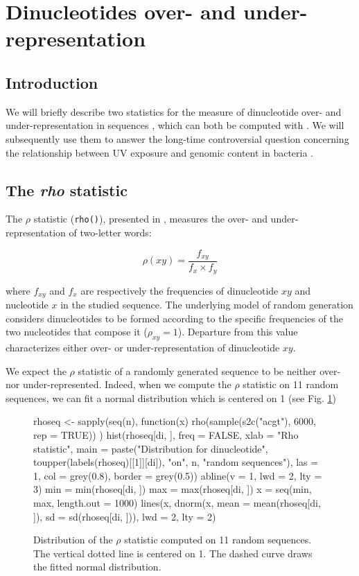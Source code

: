 \documentclass{article}
\begin{document}
\section{Dinucleotides over- and under-representation}
\label{dinu}

\subsection{Introduction}

We will briefly describe two statistics for the measure of
dinucleotide over- and under-representation in sequences
\cite{Karlin,UV}, which can both be computed with \seqinr{}. We will
subsequently use them to answer the long-time controversial question
concerning the relationship between UV exposure and genomic content in
bacteria \cite{Singer,Bak}.

\subsection{The \textit{rho} statistic}

The $\rho$ statistic (\texttt{rho()}), presented in \cite{Karlin},
measures the over- and under-representation of two-letter words:

$$\rho(xy) = \frac{f_{xy}}{f_{x}\times f_{y}}$$

where $f_{xy}$ and $f_{x}$ are respectively the frequencies of
dinucleotide $xy$ and nucleotide $x$ in the studied sequence. The
underlying model of random generation considers dinucleotides to be
formed according to the specific frequencies of the two nucleotides
that compose it ($\rho_{xy} = 1$). Departure from this value
characterizes either over- or under-representation of dinucleotide
$xy$.


We expect the $\rho$ statistic of a randomly generated sequence to be
neither over- nor under-represented. Indeed, when we compute the
$\rho$ statistic on 11 random
sequences, we can fit a normal distribution which is centered on 1
(see Fig. \ref{rho})

\begin{figure}[H]
  \begin{center}
\begin{Schunk}
\begin{Sinput}
 rhoseq <- sapply(seq(n), function(x) {
     rho(sample(s2c("acgt"), 6000, rep = TRUE))
 })
 hist(rhoseq[di, ], freq = FALSE, xlab = "Rho statistic", main = paste("Distribution for dinucleotide", 
     toupper(labels(rhoseq)[[1]][di]), "on", n, "random sequences"), 
     las = 1, col = grey(0.8), border = grey(0.5))
 abline(v = 1, lwd = 2, lty = 3)
 min = min(rhoseq[di, ])
 max = max(rhoseq[di, ])
 x = seq(min, max, length.out = 1000)
 lines(x, dnorm(x, mean = mean(rhoseq[di, ]), sd = sd(rhoseq[di, 
     ])), lwd = 2, lty = 2)
\end{Sinput}
\end{Schunk}
\end{center}
   \caption{Distribution of the $\rho$ statistic computed on
     11 random sequences. The vertical
     dotted line is centered on 1. The dashed curve draws the fitted normal
     distribution.}
   \label{rho}
   \end{figure}
\end{document}

